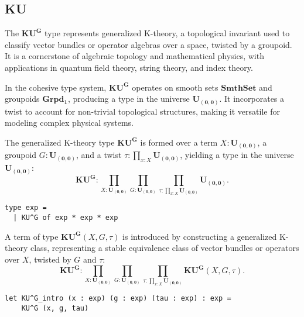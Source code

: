 \documentclass{article}
\begin{document}
\subsection{KU}

The $\mathbf{KU^G}$ type represents generalized K-theory, a topological invariant
used to classify vector bundles or operator algebras over a space, twisted by a
groupoid. It is a cornerstone of algebraic topology and mathematical physics,
with applications in quantum field theory, string theory, and index theory.

In the cohesive type system, $\mathbf{KU^G}$ operates on smooth
sets $\mathbf{SmthSet}$ and groupoids $\mathbf{Grpd_{1}}$, producing
a type in the universe $\mathbf{U_{(0,0)}}$. It incorporates a twist
to account for non-trivial topological structures, making it versatile for modeling complex physical systems.

\begin{definition}[KU$^G$-Formation]
The generalized K-theory type $\mathbf{KU^G}$ is formed over
a term $X : \mathbf{U_{(0,0)}}$, a groupoid $G : \mathbf{U_{(0,0)}}$,
and a twist $\tau : \prod_{x : X} \mathbf{U_{(0,0)}}$, yielding a type
in the universe $\mathbf{U_{(0,0)}}$:
\[
\mathbf{KU^G} : \prod_{X : \mathbf{U_{(0,0)}}} \prod_{G : \mathbf{U_{(0,0)}}} \prod_{\tau : \prod_{x : X} \mathbf{U_{(0,0)}}} \mathbf{U_{(0,0)}}.
\]
\begin{lstlisting}[mathescape=true]
type exp =
  | KU^G of exp * exp * exp
\end{lstlisting}
\end{definition}

\begin{definition}[KU$^G$-Introduction]
A term of type $\mathbf{KU^G}(X, G, \tau)$ is introduced by
constructing a generalized K-theory class, representing a stable
equivalence class of vector bundles or operators over $X$, twisted by $G$ and $\tau$:
\[
\mathbf{KU^G} :
\prod_{X : \mathbf{U_{(0,0)}}} \prod_{G : \mathbf{U_{(0,0)}}} \prod_{\tau : \prod_{x : X} \mathbf{U_{(0,0)}}} \mathbf{KU^G}(X, G, \tau).
\]
\begin{lstlisting}[mathescape=true]
let KU^G_intro (x : exp) (g : exp) (tau : exp) : exp =
    KU^G (x, g, tau)
\end{lstlisting}
\end{definition}
\end{document}
